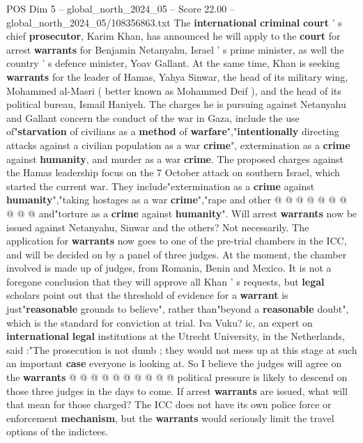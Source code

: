 \begin{textsample}{POS Dim 5 – global\_north\_2024\_05 – Score 22.00 – global\_north\_2024\_05/108356863.txt}  \label{ex:f5_pos_162}
The \textbf{international} \textbf{criminal} \textbf{court} ' s chief \textbf{prosecutor}, Karim Khan, has announced he will apply to the \textbf{court} for arrest \textbf{warrants} for Benjamin Netanyahu, Israel ' s prime minister, as well the country ' s defence minister, Yoav Gallant.
At the same time, Khan is seeking \textbf{warrants} for the leader of Hamas, Yahya Sinwar, the head of its military wing, Mohammed al-Masri ( better known as Mohammed Deif ), and the head of its political bureau, Ismail Haniyeh.
The charges he is pursuing against Netanyahu and Gallant concern the conduct of the war in Gaza, include the use of"\textbf{starvation} of civilians as a \textbf{method} of \textbf{warfare}","\textbf{intentionally} directing attacks against a civilian population as a war \textbf{crime}", extermination as a \textbf{crime} against \textbf{humanity}, and murder as a war \textbf{crime}.
The proposed charges against the Hamas leadership focus on the 7 October attack on southern Israel, which started the current war.
They include"extermination as a \textbf{crime} against \textbf{humanity}","taking hostages as a war \textbf{crime}","rape and other @ @ @ @ @ @ @ @ @ @ and"torture as a \textbf{crime} against \textbf{humanity}".
Will arrest \textbf{warrants} now be issued against Netanyahu, Sinwar and the others?
Not necessarily.
The application for \textbf{warrants} now goes to one of the pre-trial chambers in the ICC, and will be decided on by a panel of three judges.
At the moment, the chamber involved is made up of judges, from Romania, Benin and Mexico.
It is not a foregone conclusion that they will approve all Khan ' s requests, but \textbf{legal} scholars point out that the threshold of evidence for a \textbf{warrant} is just"\textbf{reasonable} grounds to believe", rather than"beyond a \textbf{reasonable} doubt", which is the standard for conviction at trial.
Iva Vuku? ic, an expert on \textbf{international} \textbf{legal} institutions at the Utrecht University, in the Netherlands, said :"The prosecution is not dumb ; they would not mess up at this stage at such an important \textbf{case} everyone is looking at.
So I believe the judges will agree on the \textbf{warrants} @ @ @ @ @ @ @ @ @ @ political pressure is likely to descend on those three judges in the days to come.
If arrest \textbf{warrants} are issued, what will that mean for those charged?
The ICC does not have its own police force or enforcement \textbf{mechanism}, but the \textbf{warrants} would seriously limit the travel options of the indictees.

\end{textsample}
